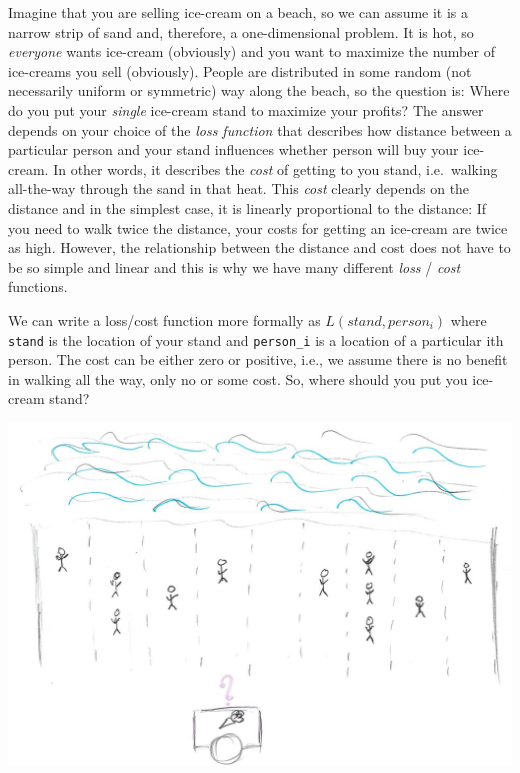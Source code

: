 \documentclass[
]{book}
\begin{document}
Imagine that you are selling ice-cream on a beach, so we can assume it is a narrow strip of sand and, therefore, a one-dimensional problem. It is hot, so \emph{everyone} wants ice-cream (obviously) and you want to maximize the number of ice-creams you sell (obviously). People are distributed in some random (not necessarily uniform or symmetric) way along the beach, so the question is: Where do you put your \emph{single} ice-cream stand to maximize your profits? The answer depends on your choice of the \emph{loss function} that describes how distance between a particular person and your stand influences whether person will buy your ice-cream. In other words, it describes the \emph{cost} of getting to you stand, i.e.~walking all-the-way through the sand in that heat. This \emph{cost} clearly depends on the distance and in the simplest case, it is linearly proportional to the distance: If you need to walk twice the distance, your costs for getting an ice-cream are twice as high. However, the relationship between the distance and cost does not have to be so simple and linear and this is why we have many different \emph{loss} / \emph{cost} functions.

We can write a loss/cost function more formally as \(L(stand, person_i)\) where \texttt{stand} is the location of your stand and \texttt{person\_i} is a location of a particular ith person. The cost can be either zero or positive, i.e., we assume there is no benefit in walking all the way, only no or some cost. So, where should you put you ice-cream stand?

\begin{center}\includegraphics[width=1\linewidth]{images/loss-functions-where-to} \end{center}
\end{document}
